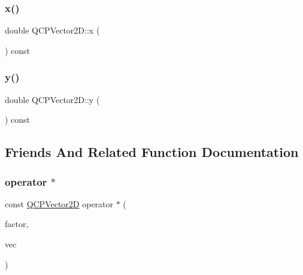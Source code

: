 \subsubsection{\texorpdfstring{x()}{x()}}
{\footnotesize\ttfamily double Q\+C\+P\+Vector2\+D\+::x (\begin{DoxyParamCaption}{ }\end{DoxyParamCaption}) const\hspace{0.3cm}{\ttfamily [inline]}}

\mbox{\label{class_q_c_p_vector2_d_a6398fb643ba380d7961a4b208f4eecf1}} 
\subsubsection{\texorpdfstring{y()}{y()}}
{\footnotesize\ttfamily double Q\+C\+P\+Vector2\+D\+::y (\begin{DoxyParamCaption}{ }\end{DoxyParamCaption}) const\hspace{0.3cm}{\ttfamily [inline]}}



\subsection{Friends And Related Function Documentation}
\mbox{\label{class_q_c_p_vector2_d_a7fdd50278959df14c8fdbcbaa16e6073}} 
\subsubsection{\texorpdfstring{operator $\ast$}{operator *}\hspace{0.1cm}{\footnotesize\ttfamily [1/2]}}
{\footnotesize\ttfamily const \mbox{\hyperlink{class_q_c_p_vector2_d}{Q\+C\+P\+Vector2D}} operator $\ast$ (\begin{DoxyParamCaption}\item[{double}]{factor,  }\item[{const \mbox{\hyperlink{class_q_c_p_vector2_d}{Q\+C\+P\+Vector2D}} \&}]{vec }\end{DoxyParamCaption})\hspace{0.3cm}{\ttfamily [friend]}}

